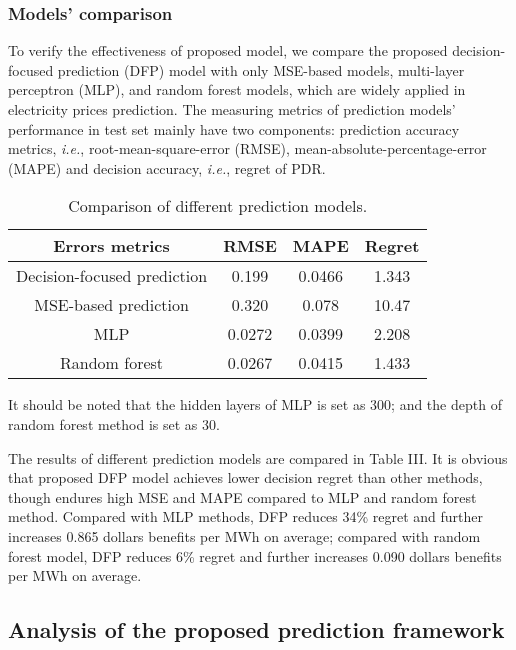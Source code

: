 \documentclass[journal]{IEEEtran}
\begin{document}
\subsubsection{Models' comparison}
To verify the effectiveness of proposed model, we compare the proposed decision-focused prediction (DFP) model with only MSE-based models, multi-layer perceptron (MLP), and random forest models, which are widely applied in electricity prices prediction. The measuring metrics of prediction models' performance in test set mainly have two components: prediction accuracy metrics, \textit{i.e.}, root-mean-square-error (RMSE), mean-absolute-percentage-error (MAPE) and decision accuracy, \textit{i.e.}, regret of PDR. 
\begin{table}[!t]
  \renewcommand{\arraystretch}{1.3}
  \centering
  \label{models_comparison}
  \caption{Comparison of different prediction models.}
  \begin{tabular}{cccc}
    \hline
    Errors metrics &  RMSE & MAPE & Regret \\
    \hline
    Decision-focused prediction & 0.199 & 0.0466 & 1.343  \\
    MSE-based prediction & 0.320 & 0.078 & 10.47 \\
    MLP & 0.0272 & 0.0399 & 2.208\\
    Random forest & 0.0267 & 0.0415 & 1.433 \\
    \hline
  \end{tabular}
  \vspace{1ex}

  {\raggedright It should be noted that the hidden layers of MLP is set as 300; and the depth of random forest method is set as 30.\par}
\end{table}

The results of different prediction models are compared in Table III. It is obvious that proposed DFP model achieves lower decision regret than other methods, though endures high MSE and MAPE compared to MLP and random forest method. Compared with MLP methods, DFP reduces 34\% regret and further increases 0.865 dollars benefits per MWh on average; compared with random forest model, DFP reduces 6\% regret and further increases 0.090 dollars benefits per MWh on average.


\subsection{Analysis of the proposed prediction framework}
\end{document}
